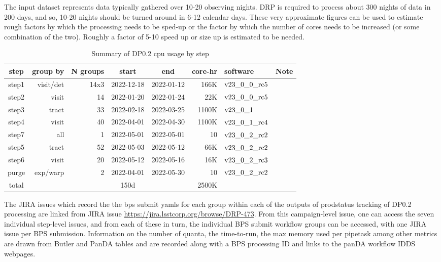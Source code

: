 \documentclass[OPS,authoryear,toc]{lsstdoc}
\begin{document}
The input dataset represents data typically gathered over 10-20
observing nights.  DRP is required to process about 300 nights of data
in 200 days, and so, 10-20 nights should be turned around in 6-12
calendar days.  These very approximate figures can be used to estimate rough
factors by which the processing needs to be sped-up or the factor by
which the number of cores needs to be increased 
(or some combination of the two).  Roughly a factor of 5-10 speed 
up or size up is estimated to be needed.


\begin{center}
\begin{table}[ht]
\caption{Summary of DP0.2 cpu usage by step}
\begin{tabular} { |c|r|r|c|c|r|l|l|}
\hline
step & group by & N groups & start & end & core-hr & software & Note\\
\hline
step1 & visit/det & 14x3 &2022-12-18& 2022-01-12 & 166K & $\rm v23\_0\_0\_rc5$ &\\
step2 & visit  & 14 & 2022-01-20& 2022-01-24 & 22K & $\rm v23\_0\_0\_rc5$ &\\
step3 & tract & 33 & 2022-02-18& 2022-03-25 & 1100K & $\rm v23\_0\_1$ &\\
step4 & visit & 40& 2022-04-01& 2022-04-30 & 1100K & $\rm v23\_0\_1\_rc4$ &\\
step7 & all & 1 & 2022-05-01& 2022-05-01 & 10 & $\rm v23\_0\_2\_rc2$ &\\
step5 & tract & 52 & 2022-05-03& 2022-05-12 & 66K & $\rm v23\_0\_2\_rc2$ &\\
step6 & visit & 20&2022-05-12& 2022-05-16 & 16K & $\rm v23\_0\_2\_rc3$ &\\
purge & exp/warp & 2 & 2022-04-01& 2022-05-30 & 10 & $\rm v23\_0\_2\_rc2$ & \\
\hline
total & & & 150d & & 2500K &&\\
\hline
\end{tabular}
\label{tab:summarycpu}
\end{table}
\end{center}

The JIRA issues which record the the bps submit yamls for each group
within each of the outputs of {\rm prodstatus} tracking of DP0.2
processing are linked from JIRA issue
\url{https://jira.lsstcorp.org/browse/DRP-473}.  From this 
campaign-level issue, one can access the seven individual step-level
issues, and from each of these in turn, the individual BPS submit
workflow groups can be accessed, with one JIRA issue per BPS submission.  
Information on the number of quanta, the time-to-run, the max memory used 
per pipetask among other metrics are drawn from Butler and PanDA tables 
and are recorded along with a BPS processing ID and links to the panDA
workflow IDDS webpages.
\end{document}
